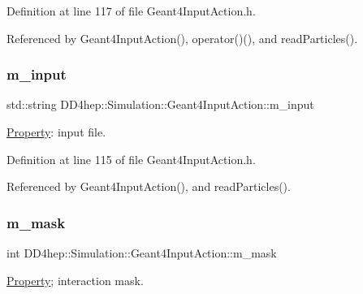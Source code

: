 Definition at line 117 of file Geant4\+Input\+Action.\+h.



Referenced by Geant4\+Input\+Action(), operator()(), and read\+Particles().

\hypertarget{class_d_d4hep_1_1_simulation_1_1_geant4_input_action_ac104781f934d0a6737dba78a2dfa6931}{}\label{class_d_d4hep_1_1_simulation_1_1_geant4_input_action_ac104781f934d0a6737dba78a2dfa6931} 
\subsubsection{\texorpdfstring{m\+\_\+input}{m\_input}}
{\footnotesize\ttfamily std\+::string D\+D4hep\+::\+Simulation\+::\+Geant4\+Input\+Action\+::m\+\_\+input\hspace{0.3cm}{\ttfamily [protected]}}



\hyperlink{class_d_d4hep_1_1_property}{Property}\+: input file. 



Definition at line 115 of file Geant4\+Input\+Action.\+h.



Referenced by Geant4\+Input\+Action(), and read\+Particles().

\hypertarget{class_d_d4hep_1_1_simulation_1_1_geant4_input_action_a850fdde95d63db4a76929fbda7ccf35e}{}\label{class_d_d4hep_1_1_simulation_1_1_geant4_input_action_a850fdde95d63db4a76929fbda7ccf35e} 
\subsubsection{\texorpdfstring{m\+\_\+mask}{m\_mask}}
{\footnotesize\ttfamily int D\+D4hep\+::\+Simulation\+::\+Geant4\+Input\+Action\+::m\+\_\+mask\hspace{0.3cm}{\ttfamily [protected]}}



\hyperlink{class_d_d4hep_1_1_property}{Property}; interaction mask. 



